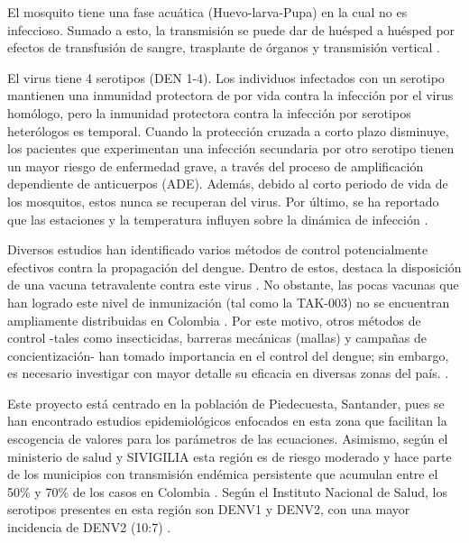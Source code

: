 \documentclass[journal]{IEEEtran}
\begin{document}
El mosquito tiene una fase acuática (Huevo-larva-Pupa) en la cual no es infeccioso. Sumado a esto, la transmisión se puede dar de huésped a huésped por efectos de transfusión de sangre, trasplante de órganos y transmisión vertical \cite{article3}. 

El virus tiene 4 serotipos (DEN 1-4). Los individuos infectados con un serotipo mantienen una inmunidad protectora de por vida contra la infección por el virus homólogo, pero la inmunidad protectora contra la infección por serotipos heterólogos es temporal. Cuando la protección cruzada a corto plazo disminuye, los pacientes que experimentan una infección secundaria por otro serotipo tienen un mayor riesgo de enfermedad grave, a través del proceso de amplificación dependiente de anticuerpos (ADE). Además, debido al corto periodo de vida de los mosquitos, estos nunca se recuperan del virus. Por último, se ha reportado que las estaciones y la temperatura influyen sobre la dinámica de infección \cite{aguiar_anam_blyuss_estadilla_guerrero_knopoff_kooi_srivastav_steindorf_stollenwerk_2022}.

Diversos estudios han identificado varios métodos de control potencialmente efectivos contra la propagación del dengue. Dentro de estos, destaca la disposición de una vacuna tetravalente contra este virus \cite{pang_mak_gubler_2017, quintero_garcia-betancourt_cortes_garcia_alcala_gonzalez-uribe_brochero_carrasquilla_2015}. No obstante, las pocas vacunas que han logrado este nivel de inmunización (tal como la TAK-003) no se encuentran ampliamente distribuidas en Colombia \cite{claypool_brandeau_goldhaber-fiebert_2021}.  Por este motivo, otros métodos de control -tales como insecticidas, barreras mecánicas (mallas) y campañas de concientización- han tomado importancia en el control del dengue; sin embargo, es necesario investigar con mayor detalle su eficacia en diversas zonas del país. \cite{pang_mak_gubler_2017, quintero_garcia-betancourt_cortes_garcia_alcala_gonzalez-uribe_brochero_carrasquilla_2015, santos_parra-henao_silva_augusto_2014}.

Este proyecto está centrado en la población de Piedecuesta, Santander, pues se han encontrado estudios epidemiológicos enfocados en esta zona que facilitan la escogencia de valores para los parámetros de las ecuaciones. Asimismo, según el ministerio de salud y SIVIGILIA esta región es de riesgo moderado y hace parte de los municipios con transmisión endémica persistente que acumulan entre el 50\% y 70\% de los casos en Colombia \cite{article1}. Según el Instituto Nacional de Salud, los serotipos presentes en esta región son DENV1 y DENV2, con una mayor incidencia de DENV2 (10:7) \cite{insti, perez} . %
\end{document}
